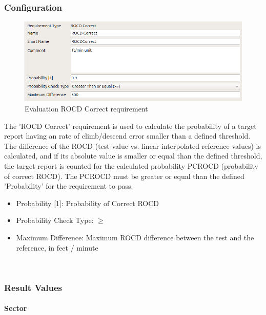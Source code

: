 \subsubsection{Configuration}

\begin{figure}[H]
    \includegraphics[width=14cm,frame]{figures/eval_req_rocd_correct.png}
  \caption{Evaluation ROCD Correct requirement}
\end{figure}

The 'ROCD Correct' requirement is used to calculate the probability of a target report having an rate of climb/descend error smaller than a defined threshold. The difference of the ROCD (test value vs. linear interpolated reference values) is calculated, and if its absolute value is smaller or equal than the defined threshold, the target report is counted for the calculated probability PCROCD (probability of correct ROCD). The PCROCD must be greater or equal than the defined 'Probability' for the requirement to pass. \\

\begin{itemize}  
\item Probability [1]: Probability of Correct ROCD
\item Probability Check Type: $\geq$
\item Maximum Difference: Maximum ROCD difference between the test and the reference, in feet / minute
\end{itemize}
\ \\

\subsubsection{Result Values}

\paragraph{Sector}

